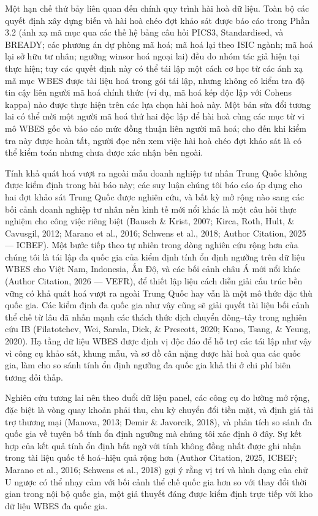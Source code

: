 \documentclass[12pt,a4paper]{article}
\begin{document}
Một hạn chế thứ bảy liên quan đến chính quy trình hài hoà dữ liệu. Toàn
bộ các quyết định xây dựng biến và hài hoà chéo đợt khảo sát được báo
cáo trong Phần 3.2 (ánh xạ mã mục qua các thế hệ bảng câu hỏi PICS3,
Standardised, và BREADY; các phương án dự phòng mã hoá; mã hoá lại theo
ISIC ngành; mã hoá lại sở hữu tư nhân; ngưỡng winsor hoá ngoại lai) đều
do nhóm tác giả hiện tại thực hiện; tuy các quyết định này có thể tái
lập một cách cơ học từ các ánh xạ mã mục WBES được tài liệu hoá trong
gói tái lập, nhưng không có kiểm tra độ tin cậy liên người mã hoá chính
thức (ví dụ, mã hoá kép độc lập với Cohen\textquotesingle s kappa) nào
được thực hiện trên các lựa chọn hài hoà này. Một bản sửa đổi tương lai
có thể mời một người mã hoá thứ hai độc lập để hài hoà cùng các mục từ
vi mô WBES gốc và báo cáo mức đồng thuận liên người mã hoá; cho đến khi
kiểm tra này được hoàn tất, người đọc nên xem việc hài hoà chéo đợt khảo
sát là có thể kiểm toán nhưng chưa được xác nhận bên ngoài.

Tính khả quát hoá vượt ra ngoài mẫu doanh nghiệp tư nhân Trung Quốc
không được kiểm định trong bài báo này; các suy luận chúng tôi báo cáo
áp dụng cho hai đợt khảo sát Trung Quốc được nghiên cứu, và bất kỳ mở
rộng nào sang các bối cảnh doanh nghiệp tư nhân nền kinh tế mới nổi khác
là một câu hỏi thực nghiệm cho công việc riêng biệt (Bausch \& Krist,
2007; Kirca, Roth, Hult, \& Cavusgil, 2012; Marano et al., 2016; Schwens
et al., 2018; Author Citation, 2025 --- ICBEF). Một bước tiếp theo tự
nhiên trong dòng nghiên cứu rộng hơn của chúng tôi là tái lập đa quốc
gia của kiểm định tính ổn định ngưỡng trên dữ liệu WBES cho Việt Nam,
Indonesia, Ấn Độ, và các bối cảnh châu Á mới nổi khác (Author Citation,
2026 --- VEFR), để thiết lập liệu cách diễn giải cấu trúc bền vững có
khả quát hoá vượt ra ngoài Trung Quốc hay vẫn là một mô thức đặc thù
quốc gia. Các kiểm định đa quốc gia như vậy cũng sẽ giải quyết tài liệu
bối cảnh thể chế từ lâu đã nhấn mạnh các thách thức dịch chuyển
đông--tây trong nghiên cứu IB (Filatotchev, Wei, Sarala, Dick, \&
Prescott, 2020; Kano, Tsang, \& Yeung, 2020). Hạ tầng dữ liệu WBES được
định vị độc đáo để hỗ trợ các tái lập như vậy vì công cụ khảo sát, khung
mẫu, và sơ đồ cân nặng được hài hoà qua các quốc gia, làm cho so sánh
tính ổn định ngưỡng đa quốc gia khả thi ở chi phí biên tương đối thấp.

Nghiên cứu tương lai nên theo đuổi dữ liệu panel, các công cụ đo lường
mở rộng, đặc biệt là vòng quay khoản phải thu, chu kỳ chuyển đổi tiền
mặt, và định giá tài trợ thương mại (Manova, 2013; Demir \& Javorcik,
2018), và phân tích so sánh đa quốc gia về tuyên bố tính ổn định ngưỡng
mà chúng tôi xác định ở đây. Sự kết hợp của kết quả tính ổn định bất ngờ
với tính không đồng nhất được ghi nhận trong tài liệu quốc tế hoá--hiệu
quả rộng hơn (Author Citation, 2025, ICBEF; Marano et al., 2016; Schwens
et al., 2018) gợi ý rằng vị trí và hình dạng của chữ U ngược có thể nhạy
cảm với bối cảnh thể chế quốc gia hơn so với thay đổi thời gian trong
nội bộ quốc gia, một giả thuyết đáng được kiểm định trực tiếp với kho dữ
liệu WBES đa quốc gia.
\end{document}
